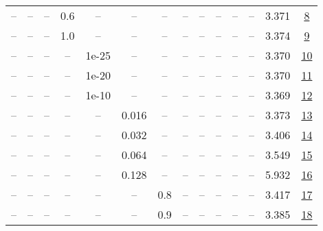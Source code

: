\begin{table}[H]
\begin{tabular}{cccccccccccccc}
-- & -- & -- & 0.6 & -- & -- & -- & -- & -- & -- & -- & -- & 3.371 & \href{https://wandb.ai/stanford-mercury/optimizer-scaling/runs/sweep-130m-5B-muon27b9aelr0.008-wd0.1-minlr0-warmup0-b10.8-b20.9-f1ef5a}{8} \\
-- & -- & -- & 1.0 & -- & -- & -- & -- & -- & -- & -- & -- & 3.374 & \href{https://wandb.ai/stanford-mercury/optimizer-scaling/runs/sweep-130m-5B-muon322641lr0.008-wd0.1-minlr0-warmup0-b10.8-b20.9-3d0985}{9} \\
-- & -- & -- & -- & 1e-25 & -- & -- & -- & -- & -- & -- & -- & 3.370 & \href{https://wandb.ai/stanford-mercury/optimizer-scaling/runs/sweep-130m-5B-muonfadaa6lr0.008-wd0.1-minlr0-warmup0-b10.8-b20.9-c07478}{10} \\
-- & -- & -- & -- & 1e-20 & -- & -- & -- & -- & -- & -- & -- & 3.370 & \href{https://wandb.ai/stanford-mercury/optimizer-scaling/runs/sweep-130m-5B-muon3576f8lr0.008-wd0.1-minlr0-warmup0-b10.8-b20.9-741df0}{11} \\
-- & -- & -- & -- & 1e-10 & -- & -- & -- & -- & -- & -- & -- & 3.369 & \href{https://wandb.ai/stanford-mercury/optimizer-scaling/runs/sweep-130m-5B-muonf9afe0lr0.008-wd0.1-minlr0-warmup0-b10.8-b20.9-fce4b0}{12} \\
-- & -- & -- & -- & -- & 0.016 & -- & -- & -- & -- & -- & -- & 3.373 & \href{https://wandb.ai/stanford-mercury/optimizer-scaling/runs/sweep-130m-5B-muonf3214elr0.016-wd0.1-minlr0-warmup0-b10.8-b20.9-5d4d4f}{13} \\
-- & -- & -- & -- & -- & 0.032 & -- & -- & -- & -- & -- & -- & 3.406 & \href{https://wandb.ai/stanford-mercury/optimizer-scaling/runs/sweep-130m-5B-muon47b684lr0.032-wd0.1-minlr0-warmup0-b10.8-b20.9-9ff8e3}{14} \\
-- & -- & -- & -- & -- & 0.064 & -- & -- & -- & -- & -- & -- & 3.549 & \href{https://wandb.ai/stanford-mercury/optimizer-scaling/runs/sweep-130m-5B-muon8dfeeclr0.064-wd0.1-minlr0-warmup0-b10.8-b20.9-4639b6}{15} \\
-- & -- & -- & -- & -- & 0.128 & -- & -- & -- & -- & -- & -- & 5.932 & \href{https://wandb.ai/stanford-mercury/optimizer-scaling/runs/sweep-130m-5B-muoncd7567lr0.128-wd0.1-minlr0-warmup0-b10.8-b20.9-94d384}{16} \\
-- & -- & -- & -- & -- & -- & 0.8 & -- & -- & -- & -- & -- & 3.417 & \href{https://wandb.ai/stanford-mercury/optimizer-scaling/runs/sweep-130m-5B-muon2bb145lr0.008-wd0.1-minlr0-warmup0-b10.8-b20.9-853273}{17} \\
-- & -- & -- & -- & -- & -- & 0.9 & -- & -- & -- & -- & -- & 3.385 & \href{https://wandb.ai/stanford-mercury/optimizer-scaling/runs/sweep-130m-5B-muon1e4ecflr0.008-wd0.1-minlr0-warmup0-b10.8-b20.9-879792}{18} \\

\end{tabular}
\end{table}
